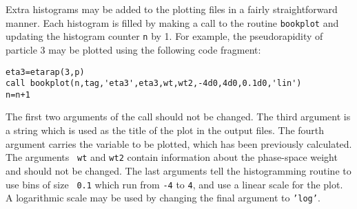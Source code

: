Extra histograms may be added to the plotting files in
a fairly straightforward manner. Each histogram is filled by making
a call to the routine {\tt bookplot} and updating the histogram
counter {\tt n} by 1. For example, the pseudorapidity of particle $3$
may be plotted using the following code fragment:

\begin{verbatim}
eta3=etarap(3,p)
call bookplot(n,tag,'eta3',eta3,wt,wt2,-4d0,4d0,0.1d0,'lin')
n=n+1
\end{verbatim}
The first two arguments of the call should not be changed. The third
argument is a string which is used as the title of the plot in the
output files. The fourth argument carries the variable to
be plotted, which has been previously calculated. The arguments {\tt
	wt} and {\tt wt2} contain information about the phase-space weight and
should not be changed. The
last arguments tell the histogramming routine to use bins of size {\tt
	0.1} which run from {\tt -4} to {\tt 4}, and use a linear scale for
the plot. A logarithmic scale may be used by changing the final
argument to {\tt 'log'}.


